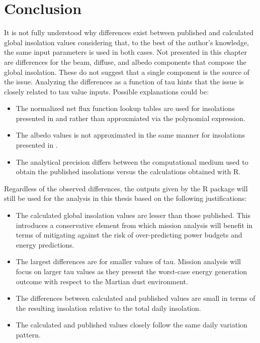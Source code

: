 \section{Conclusion}
It is not fully understood why differences exist between published and calculated global insolation values considering that, to the best of the author's knowledge, the same input parameters is used in both cases. Not presented in this chapter are differences for the beam, diffuse, and albedo components that compose the global insolation. These do not suggest that a single component is the source of the issue. Analyzing the differences as a function of tau hints that the issue is closely related to tau value inputs. Possible explanations could be:
\begin{itemize}
    \item The normalized net flux function lookup tables are used for insolations presented in  and  rather than approxmiated via the polynomial expression.
    \item The albedo values is not approximated in the same manner for insolations presented in .
    \item The analytical precision differs between the computational medium used to obtain the published insolations versus the calculations obtained with R.
\end{itemize}

Regardless of the observed differences, the outputs given by the R package will still be used for the analysis in this thesis based on the following justifications:
\begin{itemize}
  \item The calculated global insolation values are lesser than those published. This introduces a conservative element from which mission analysis will benefit in terms of mitigating against the risk of over-predicting power budgets and energy predictions.
  \item The largest differences are for smaller values of tau. Mission analysis will focus on larger tau values as they present the worst-case energy generation outcome with respect to the Martian dust environment.
  \item The differences between calculated and published values are small in terms of the resulting insolation relative to the total daily insolation.
  \item The calculated and published values closely follow the same daily variation pattern.
\end{itemize}
